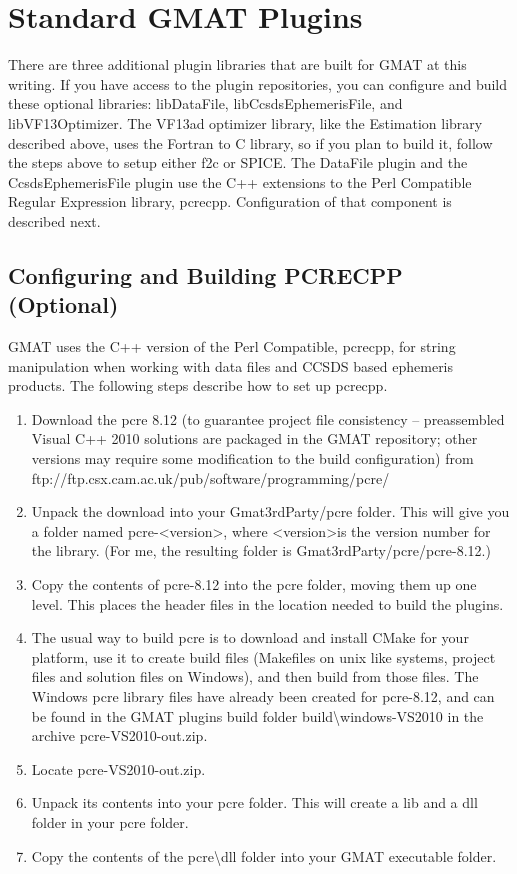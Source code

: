 \documentclass[letterpaper,10pt]{article}%
\begin{document}
{\section{\label{sec:Plugins}Standard GMAT Plugins}

There are three additional plugin libraries that are built for GMAT at this writing.  If you have access to the plugin repositories, you can configure and build these optional libraries: libDataFile, libCcsdsEphemerisFile, and libVF13Optimizer.  The VF13ad optimizer library, like the Estimation library described above, uses the Fortran to C library, so if you plan to build it, follow the steps above to setup either f2c or SPICE.  The DataFile plugin and the CcsdsEphemerisFile plugin use the C++ extensions to the Perl Compatible Regular Expression library, pcrecpp.  Configuration of that component is described next.

\subsection{Configuring and Building PCRECPP (Optional)}

GMAT uses the C++ version of the Perl Compatible, pcrecpp, for string manipulation when working with data files and CCSDS based ephemeris products.  The following steps describe how to set up pcrecpp.

\begin{enumerate}
\item Download the pcre 8.12 (to guarantee project file consistency -- preassembled Visual C++ 2010 solutions are packaged in the GMAT repository; other versions may require some modification to the build configuration) from ftp://ftp.csx.cam.ac.uk/pub/software/programming/pcre/
\item Unpack the download into your Gmat3rdParty/pcre folder.  This will give you a folder named pcre-\textless version\textgreater, where \textless version\textgreater is the version number for the library.  (For me, the resulting folder is Gmat3rdParty/pcre/pcre-8.12.)
\item Copy the contents of pcre-8.12 into the pcre folder, moving them up one level.  This places the header files in the location needed to build the plugins.
\item The usual way to build pcre is to download and install CMake for your platform, use it to create build files (Makefiles on unix like systems, project files and solution files on Windows), and then build from those files. The Windows pcre library files have already been created for pcre-8.12, and can be found in the GMAT plugins build folder build\textbackslash windows-VS2010 in the archive pcre-VS2010-out.zip.
\item Locate pcre-VS2010-out.zip.
\item Unpack its contents into your pcre folder.  This will create a lib and a dll folder in your pcre folder.
\item Copy the contents of the pcre\textbackslash dll folder into your GMAT executable folder.
\end{enumerate}

}
\end{document}
